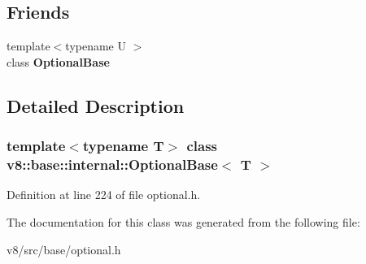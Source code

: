 \subsection*{Friends}
\begin{DoxyCompactItemize}
\item 
\mbox{\label{classv8_1_1base_1_1internal_1_1OptionalBase_ad0a2d544a7adc9646c13843053119e26}} 
{\footnotesize template$<$typename U $>$ }\\class {\bfseries Optional\+Base}
\end{DoxyCompactItemize}


\subsection{Detailed Description}
\subsubsection*{template$<$typename T$>$\newline
class v8\+::base\+::internal\+::\+Optional\+Base$<$ T $>$}



Definition at line 224 of file optional.\+h.



The documentation for this class was generated from the following file\+:\begin{DoxyCompactItemize}
\item 
v8/src/base/optional.\+h\end{DoxyCompactItemize}
